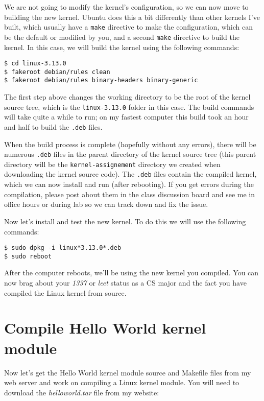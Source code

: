 \documentclass[11pt]{article}
\begin{document}
We are not going to modify the kernel's configuration, so we can now move to building the new kernel. Ubuntu does this a bit differently than other kernels I've built, which usually have a \texttt{make} directive to make the configuration, which can be the default or modified by you, and a second \texttt{make} directive to build the kernel. In this case, we will build the kernel using the following commands:

\begin{verbatim}
$ cd linux-3.13.0
$ fakeroot debian/rules clean
$ fakeroot debian/rules binary-headers binary-generic
\end{verbatim}

The first step above changes the working directory to be the root of the kernel source tree, which is the \texttt{linux-3.13.0} folder in this case. The build commands will take quite a while to run; on my fastest computer this build took an hour and half to build the \texttt{.deb} files. 

When the build process is complete (hopefully without any errors), there will be numerous \texttt{.deb} files in the parent directory of the kernel source tree (this parent directory will be the \texttt{kernel-assignement} directory we created when downloading the kernel source code). The \texttt{.deb} files contain the compiled kernel, which we can now install and run (after rebooting). If you get errors during the compilation, please post about them in the class discussion board and see me in office hours or during lab so we can track down and fix the issue.

Now let's install and test the new kernel. To do this we will use the following commands:

\begin{verbatim}
$ sudo dpkg -i linux*3.13.0*.deb
$ sudo reboot
\end{verbatim}

After the computer reboots, we'll be using the new kernel you compiled. You can now brag about your \emph{1337} or \emph{leet} status as a CS major and the fact you have compiled the Linux kernel from source. 

\section*{Compile Hello World kernel module}

Now let's get the Hello World kernel module source and Makefile files from my web server and work on compiling a Linux kernel module. You will need to download the {\it helloworld.tar} file from my website:
\end{document}
